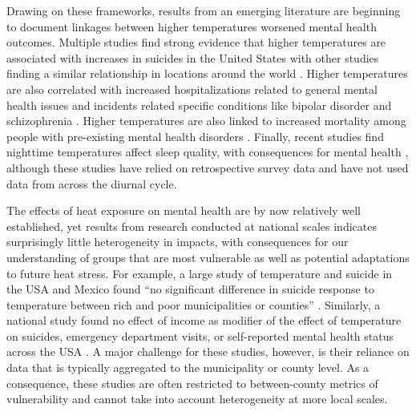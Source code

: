 \documentclass[9pt,twocolumn,twoside,lineno]{pnas-new}
\begin{document}
Drawing on these frameworks, results from an emerging literature are beginning to document linkages between higher temperatures worsened mental health outcomes. Multiple studies find strong evidence that higher temperatures are associated with increases in suicides in the United States \cite{Burke2018Aug, Mullins2019Dec, Dixon2007May} with other studies finding a similar relationship in locations around the world \cite{Qi2014Dec, Likhvar2011Jan}. Higher temperatures are also correlated with increased hospitalizations related to general mental health issues \cite{Obradovich2018Oct, Mullins2019Dec} and incidents related specific conditions like bipolar disorder and schizophrenia \cite{Lee2007Jan, Sung2013Feb}. Higher temperatures are also linked to increased mortality among people with pre-existing mental health disorders \cite{Hansen2008Oct}.  Finally, recent studies find nighttime temperatures affect sleep quality, with consequences for mental health \cite{Obradovich2017May, Mullins2019Dec}, although these studies have relied on retrospective survey data and have not used data from across the diurnal cycle. 

The effects of heat exposure on mental health are by now relatively well established, yet results from research conducted at national scales indicates surprisingly little heterogeneity in impacts, with consequences for our understanding of groups that are most vulnerable as well as potential adaptations to future heat stress. For example, a large study of temperature and suicide in the USA and Mexico found ``no significant difference in suicide response to temperature between rich and poor municipalities or counties'' \cite{Burke2018Aug}. Similarly, a national study found no effect of income as modifier of the effect of temperature on suicides, emergency department visits, or self-reported mental health status across the USA \cite{Mullins2019Dec}. A major challenge for these studies, however, is their reliance on data that is typically aggregated to the municipality or county level. As a consequence, these studies are often restricted to between-county metrics of vulnerability and cannot take into account heterogeneity at more local scales.
\end{document}
